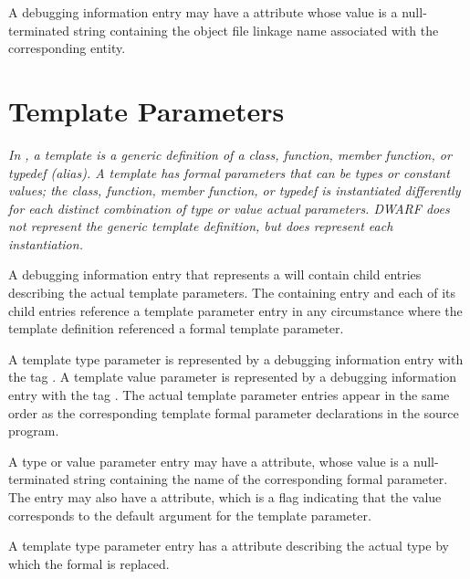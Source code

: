 A debugging information entry may have a
\DWATlinkagenameDEFN{}\hypertarget{chap:DWATlinkagenameobjectfilelinkagenameofanentity}{}
attribute
whose value is a null-terminated string containing the
object file linkage name associated with the corresponding entity.


\section{Template Parameters}
\label{chap:templateparameters}
\textit{In , a template is a generic definition
of a class, function, member function, or typedef (alias).
A template has formal parameters that
can be types or constant values; the class, function,
member function, or typedef is instantiated differently for each
distinct combination of type or value actual parameters.  DWARF does
not represent the generic template definition, but does represent each
instantiation.}

A debugging information entry that represents a
will contain child entries describing the actual template parameters.
The containing entry and each of its child entries reference a template
parameter entry in any circumstance where the template definition
referenced a formal template parameter.

A template type parameter is represented by a debugging information
entry with the tag
\DWTAGtemplatetypeparameterTARG.
A template value parameter is represented by a debugging information
entry with the tag
\DWTAGtemplatevalueparameterTARG.
The actual template parameter entries appear in the same order as the
corresponding template formal parameter declarations in the
source program.

A type or value parameter entry may have a \DWATname{} attribute,
whose value is a
null-terminated string containing the name of the corresponding
formal parameter. The entry may also have a
\DWATdefaultvalue{} attribute, which is a flag indicating
that the value corresponds to the default argument for the
template parameter.

A
template type parameter entry has a
\DWATtype{} attribute
describing the actual type by which the formal is replaced.

